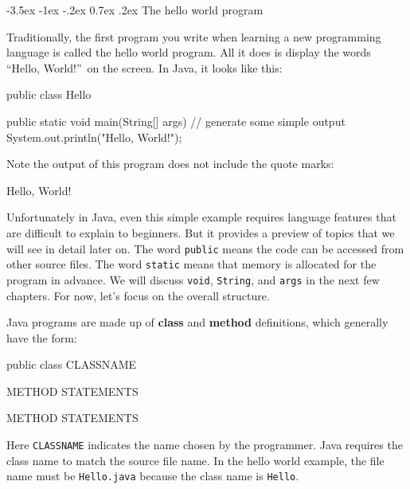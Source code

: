 \documentclass[12pt]{book}
\makeatletter
\renewcommand{\section}{\@startsection {section}{1}{\z@}%
    {-3.5ex \@plus -1ex \@minus -.2ex}%
    {0.7ex \@plus.2ex}%
    {\normalfont\Large\bfseries}}
\theoremstyle{exercise}
\newcommand{\java}[1]{\lstinline{#1}} %
\makeatother
\begin{document}
\section{The hello world program}
\label{sec:hello}


Traditionally, the first program you write when learning a new programming language is called the hello world program.
All it does is display the words ``Hello, World!''\ on the screen.
In Java, it looks like this:

\begin{code}
public class Hello {

    public static void main(String[] args) {
        // generate some simple output
        System.out.println("Hello, World!");
    }

}
\end{code}

Note the output of this program does not include the quote marks:

\begin{stdout}
Hello, World!
\end{stdout}


Unfortunately in Java, even this simple example requires language features that are difficult to explain to beginners.
But it provides a preview of topics that we will see in detail later on.
The word \java{public} means the code can be accessed from other source files.
The word \java{static} means that memory is allocated for the program in advance.
We will discuss \java{void}, \java{String}, and \java{args} in the next few chapters.
For now, let's focus on the overall structure.


Java programs are made up of {\bf class} and {\bf method} definitions, which generally have the form:

\begin{code}
public class CLASSNAME {

    METHOD {
        STATEMENTS
    }

    METHOD {
        STATEMENTS
    }

}
\end{code}


Here \java{CLASSNAME} indicates the name chosen by the programmer.
Java requires the class name to match the source file name.
In the hello world example, the file name must be {\tt Hello.java} because the class name is \java{Hello}.
\end{document}

